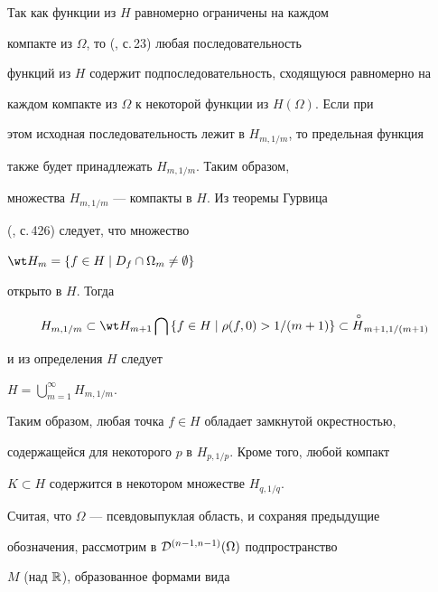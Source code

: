 \begin{pf}


Так как функции из $H$ равномерно ограничены на каждом 


компакте из $\Omega$, то (\cite{Hann}, с.\,23) любая последовательность 


функций из $H$ содержит подпоследовательность, сходящуюся равномерно на 


каждом компакте из $\Omega$ к некоторой функции из $H(\Omega)$. Если при 


этом исходная последовательность лежит в $H_{m,1/m}$, то предельная функция 


также будет принадлежать $H_{m,1/m}$. Таким образом,


множества $H_{m,1/m}$ --- компакты в $H$. Из теоремы Гурвица 


(\cite{Markus1}, с.\,426) следует, что множество 


$\wt H_m=\left\{f\in 


H\mid D_f\cap\Omega_m\not=\emptyset\right\}$


открыто в $H$. Тогда 


$$


H_{m,1/m}\subset \wt H_{m+1}\bigcap\left\{


f\in H\mid \rho(f,0)>1/(m+1)\right\} \subset 


\overset{\,\circ}{H}{}_{m+1,1/(m+1)}


$$


и из определения $H$ следует


$H=\bigcup\limits_{m=1}^{\infty}H_{m,1/m}$.





Таким образом, любая точка $f\in H$ обладает замкнутой окрестностью, 


содержащейся для некоторого $p$ в $H_{p,1/p}$. Кроме того, любой компакт 


$K\subset H$ содержится в некотором множестве ${H}_{q,1/q}$.


\end{pf}





Считая, что $\Omega$ --- псевдовыпуклая область, и сохраняя предыдущие 


обозначения, рассмотрим в ${\cal D}^{(n-1,n-1)}(\Omega)$ подпространство 


$M$ (над $\Bbb R$), образованное формами вида


$$


